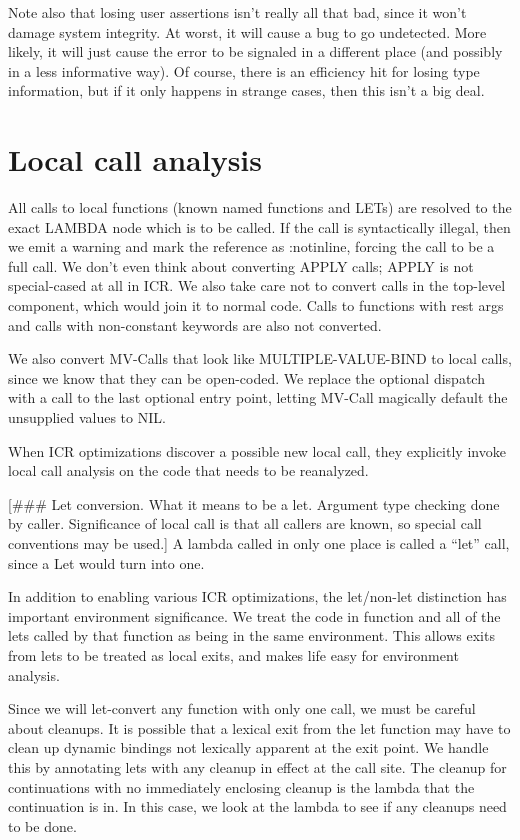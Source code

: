 Note also that losing user assertions isn't really all that bad, since it won't
damage system integrity.  At worst, it will cause a bug to go undetected.  More
likely, it will just cause the error to be signaled in a different place (and
possibly in a less informative way).  Of course, there is an efficiency hit for
losing type information, but if it only happens in strange cases, then this
isn't a big deal.


\chapter{Local call analysis}

All calls to local functions (known named functions and LETs) are resolved to
the exact LAMBDA node which is to be called.  If the call is syntactically
illegal, then we emit a warning and mark the reference as :notinline, forcing
the call to be a full call.  We don't even think about converting APPLY calls;
APPLY is not special-cased at all in ICR.  We also take care not to convert
calls in the top-level component, which would join it to normal code.  Calls to
functions with rest args and calls with non-constant keywords are also not
converted.

We also convert MV-Calls that look like MULTIPLE-VALUE-BIND to local calls,
since we know that they can be open-coded.  We replace the optional dispatch
with a call to the last optional entry point, letting MV-Call magically default
the unsupplied values to NIL.

When ICR optimizations discover a possible new local call, they explicitly
invoke local call analysis on the code that needs to be reanalyzed. 

[\#\#\# Let conversion.  What it means to be a let.  Argument type checking done
by caller.  Significance of local call is that all callers are known, so
special call conventions may be used.]
A lambda called in only one place is called a ``let'' call, since a Let would
turn into one.

In addition to enabling various ICR optimizations, the let/non-let distinction
has important environment significance.  We treat the code in function and all
of the lets called by that function as being in the same environment.  This
allows exits from lets to be treated as local exits, and makes life easy for
environment analysis.  

Since we will let-convert any function with only one call, we must be careful
about cleanups.  It is possible that a lexical exit from the let function may
have to clean up dynamic bindings not lexically apparent at the exit point.  We
handle this by annotating lets with any cleanup in effect at the call site.
The cleanup for continuations with no immediately enclosing cleanup is the
lambda that the continuation is in.  In this case, we look at the lambda to see
if any cleanups need to be done.

